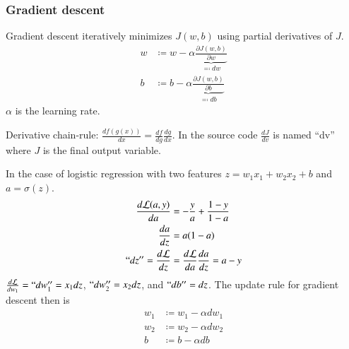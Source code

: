 \documentclass{article}
\begin{document}
\subsubsection{Gradient descent}
Gradient descent iteratively minimizes $J(w,b)$ using partial derivatives of $J$.
\begin{equation}
  \begin{split}
    w&\coloneqq w-\alpha\underbrace{\frac{\partial J(w,b)}{\partial w}}_{\eqqcolon dw}\\
    b&\coloneqq b-\alpha\underbrace{\frac{\partial J(w,b)}{\partial b}}_{\eqqcolon db}
  \end{split}
\end{equation}
$\alpha$ is the learning rate.

Derivative chain-rule: $\frac{df(g(x))}{dx}=\frac{df}{dg}\frac{dg}{dx}$.
In the source code $\frac{dJ}{dv}$ is named ``dv'' where $J$ is the final output variable.

In the case of logistic regression with two features $z=w_1x_1+w_2x_2+b$ and $a=\sigma(z)$.
\begin{equation}
  \begin{split}
    \frac{d\mathcal{L}(a,y)}{da}&=-\frac{y}{a}+\frac{1-y}{1-a}\\
    \frac{da}{dz}&=a(1-a)\\
    ``dz''=\frac{d\mathcal{L}}{dz}&=\frac{d\mathcal{L}}{da}\frac{da}{dz}=a-y
  \end{split}
\end{equation}
$\frac{d\mathcal{L}}{dw_1}=``dw_1''=x_1 dz$, $``dw_2''=x_2dz$, and $``db''=dz$.
The update rule for gradient descent then is
\begin{equation}
  \begin{split}
    w_1&\coloneqq w_1-\alpha dw_1\\
    w_2&\coloneqq w_2-\alpha dw_2\\
    b&\coloneqq b-\alpha db\\
  \end{split}
\end{equation}
\end{document}
